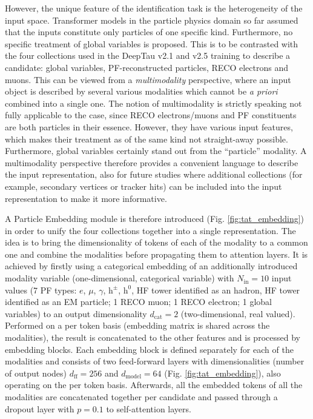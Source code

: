 However, the unique feature of the \tauh identification task is the heterogeneity of the input space. Transformer models in the particle physics domain so far assumed that the inputs constitute only particles of one specific kind. Furthermore, no specific treatment of global variables is proposed. This is to be contrasted with the four collections used in the DeepTau v2.1 and v2.5 training to describe a \tauh candidate: global variables, PF-reconstructed particles, RECO electrons and muons. This can be viewed from a \textit{multimodality} perspective, where an input object is described by several various modalities which cannot be \textit{a priori} combined into a single one. The notion of multimodality is strictly speaking not fully applicable to the \tauh case, since RECO electrons/muons and PF constituents are both particles in their essence. However, they have various input features, which makes their treatment as of the same kind not straight-away possible. Furthermore, global variables certainly stand out from the \enquote{particle} modality. A multimodality perspective therefore provides a convenient language to describe the input \tauh representation, also for future studies where additional collections (for example, secondary vertices or tracker hits) can be included into the input representation to make it more informative.  

A Particle Embedding module is therefore introduced (Fig. \ref{fig:tat_embedding}) in order to unify the four collections together into a single representation. The idea is to bring the dimensionality of tokens of each of the modality to a common one and combine the modalities before propagating them to attention layers. It is achieved by firstly using a categorical embedding of an additionally introduced modality variable (one-dimensional, categorical variable) with $N_\text{in}=10$ input values (7 PF types: $e$, $\mu$, $\gamma$, $\text{h}^\pm$, $\text{h}^0$, HF tower identified as an hadron, HF tower identified as an EM particle; 1 RECO muon; 1 RECO electron; 1 global variables) to an output dimensionality $d_\text{cat}=2$ (two-dimensional, real valued). Performed on a per token basis (embedding matrix is shared across the modalities), the result is concatenated to the other features and is processed by embedding blocks. Each embedding block is defined separately for each of the modalities and consists of two feed-forward layers with dimensionalities (number of output nodes) $d_\text{ff}=256$ and $d_\text{model}=64$ (Fig. \ref{fig:tat_embedding}), also operating on the per token basis. Afterwards, all the embedded tokens of all the modalities are concatenated together per \tauh candidate and passed through a dropout layer \cite{JMLR:v15:srivastava14a} with $p=0.1$ to self-attention layers.

